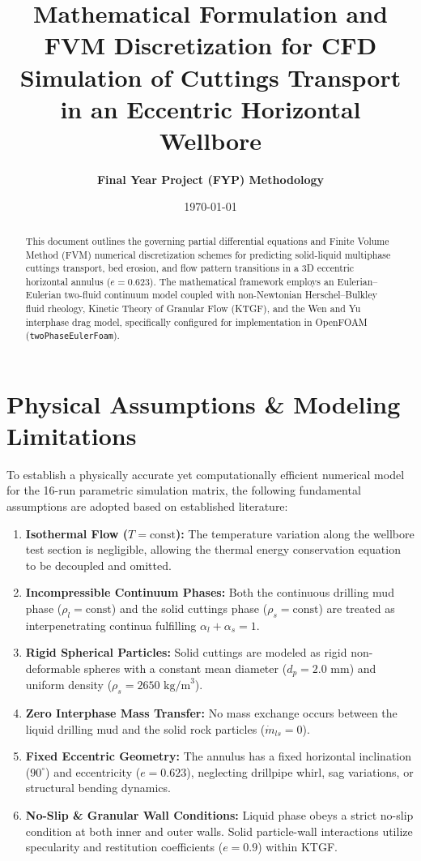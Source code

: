 \documentclass[12pt,a4paper]{article}
\title{\textbf{Mathematical Formulation and FVM Discretization for CFD Simulation of Cuttings Transport in an Eccentric Horizontal Wellbore}}
\author{\textbf{Final Year Project (FYP) Methodology}}
\date{\today}
\begin{document}
\maketitle

\begin{abstract}
This document outlines the governing partial differential equations and Finite Volume Method (FVM) numerical discretization schemes for predicting solid-liquid multiphase cuttings transport, bed erosion, and flow pattern transitions in a 3D eccentric horizontal annulus ($e = 0.623$). The mathematical framework employs an Eulerian--Eulerian two-fluid continuum model coupled with non-Newtonian Herschel--Bulkley fluid rheology, Kinetic Theory of Granular Flow (KTGF), and the Wen and Yu interphase drag model, specifically configured for implementation in OpenFOAM (\texttt{twoPhaseEulerFoam}).
\end{abstract}

\section{Physical Assumptions \& Modeling Limitations}
To establish a physically accurate yet computationally efficient numerical model for the 16-run parametric simulation matrix, the following fundamental assumptions are adopted based on established literature:
\begin{enumerate}
    \item \textbf{Isothermal Flow ($T = \text{const}$):} The temperature variation along the wellbore test section is negligible, allowing the thermal energy conservation equation to be decoupled and omitted.
    \item \textbf{Incompressible Continuum Phases:} Both the continuous drilling mud phase ($\rho_l = \text{const}$) and the solid cuttings phase ($\rho_s = \text{const}$) are treated as interpenetrating continua fulfilling $\alpha_l + \alpha_s = 1$.
    \item \textbf{Rigid Spherical Particles:} Solid cuttings are modeled as rigid non-deformable spheres with a constant mean diameter ($d_p = 2.0\text{ mm}$) and uniform density ($\rho_s = 2650\text{ kg/m}^3$).
    \item \textbf{Zero Interphase Mass Transfer:} No mass exchange occurs between the liquid drilling mud and the solid rock particles ($\dot{m}_{ls} = 0$).
    \item \textbf{Fixed Eccentric Geometry:} The annulus has a fixed horizontal inclination ($90^\circ$) and eccentricity ($e = 0.623$), neglecting drillpipe whirl, sag variations, or structural bending dynamics.
    \item \textbf{No-Slip \& Granular Wall Conditions:} Liquid phase obeys a strict no-slip condition at both inner and outer walls. Solid particle-wall interactions utilize specularity and restitution coefficients ($e = 0.9$) within KTGF.
\end{enumerate}
\end{document}
